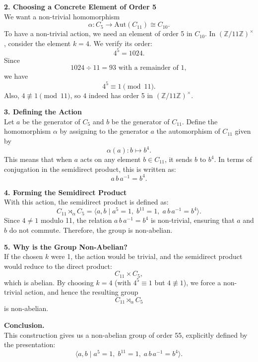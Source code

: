 \documentclass[12pt]{article}
\theoremstyle{definition} %
\theoremstyle{plain} %
\begin{document}
\medskip

\noindent
\textbf{2. Choosing a Concrete Element of Order 5} \\
We want a non-trivial homomorphism 
\[
\alpha : C_{5} \to \mathrm{Aut}(C_{11}) \cong C_{10}.
\]
To have a non-trivial action, we need an element of order 5 in \(C_{10}\). In \((\mathbb{Z}/11\mathbb{Z})^\times\), consider the element \(k = 4\). We verify its order:
\[
4^5 = 1024.
\]
Since 
\[
1024 \div 11 = 93 \text{ with a remainder of } 1, 
\]
we have
\[
4^5 \equiv 1 \pmod{11}.
\]
Also, \(4 \not\equiv 1 \pmod{11}\), so \(4\) indeed has order 5 in \((\mathbb{Z}/11\mathbb{Z})^\times\).

\medskip

\noindent
\textbf{3. Defining the Action} \\
Let \(a\) be the generator of \(C_{5}\) and \(b\) be the generator of \(C_{11}\). Define the homomorphism \(\alpha\) by assigning to the generator \(a\) the automorphism of \(C_{11}\) given by
\[
\alpha(a) : b \mapsto b^4.
\]
This means that when \(a\) acts on any element \(b \in C_{11}\), it sends \(b\) to \(b^4\). In terms of conjugation in the semidirect product, this is written as:
\[
a\, b\, a^{-1} = b^4.
\]

\medskip

\noindent
\textbf{4. Forming the Semidirect Product} \\
With this action, the semidirect product is defined as:
\[
C_{11} \rtimes_{\alpha} C_{5} = \langle a, b \mid a^5 = 1,\; b^{11} = 1,\; a\, b\, a^{-1} = b^4 \rangle.
\]
Since \(4 \neq 1\) modulo 11, the relation \(a\, b\, a^{-1} = b^4\) is non-trivial, ensuring that \(a\) and \(b\) do not commute. Therefore, the group is non-abelian.

\medskip

\noindent
\textbf{5. Why is the Group Non-Abelian?} \\
If the chosen \(k\) were 1, the action would be trivial, and the semidirect product would reduce to the direct product:
\[
C_{11} \times C_{5},
\]
which is abelian. By choosing \(k = 4\) (with \(4^5 \equiv 1\) but \(4 \not\equiv 1\)), we force a non-trivial action, and hence the resulting group
\[
C_{11} \rtimes_{\alpha} C_{5}
\]
is non-abelian.

\medskip

\noindent
\textbf{Conclusion.} \\
This construction gives us a non-abelian group of order 55, explicitly defined by the presentation:
\[
\langle a, b \mid a^5 = 1,\; b^{11} = 1,\; a\, b\, a^{-1} = b^4 \rangle.
\]
\end{document}
